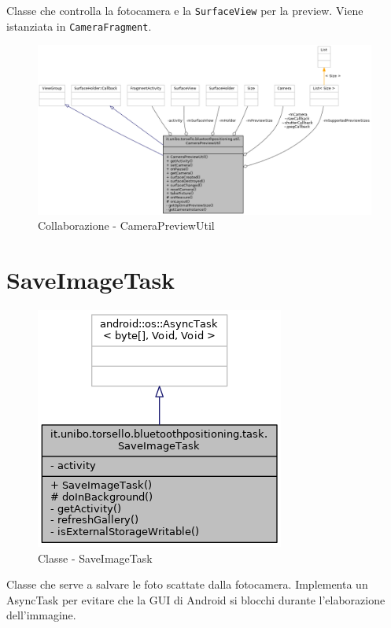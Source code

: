 Classe che controlla la fotocamera e la \texttt{SurfaceView} per la  preview. Viene istanziata in \texttt{CameraFragment}.

\begin{figure}[ph]
	\centering
	\includegraphics[width=1.5\linewidth,angle=90]{img/uml/class/classit_1_1unibo_1_1torsello_1_1bluetoothpositioning_1_1util_1_1CameraPreviewUtil__coll__graph.png}
	\caption{Collaborazione - CameraPreviewUtil}
\end{figure}

\newpage
\section{SaveImageTask}
\begin{figure}[ph]
	\centering
	\includegraphics[width=0.5\linewidth]{img/uml/class/classit_1_1unibo_1_1torsello_1_1bluetoothpositioning_1_1task_1_1SaveImageTask__inherit__graph.png}
	\caption{Classe - SaveImageTask}
\end{figure}

Classe che serve a salvare le foto scattate dalla fotocamera. Implementa un AsyncTask per evitare che la GUI di Android si blocchi durante l'elaborazione dell'immagine.

